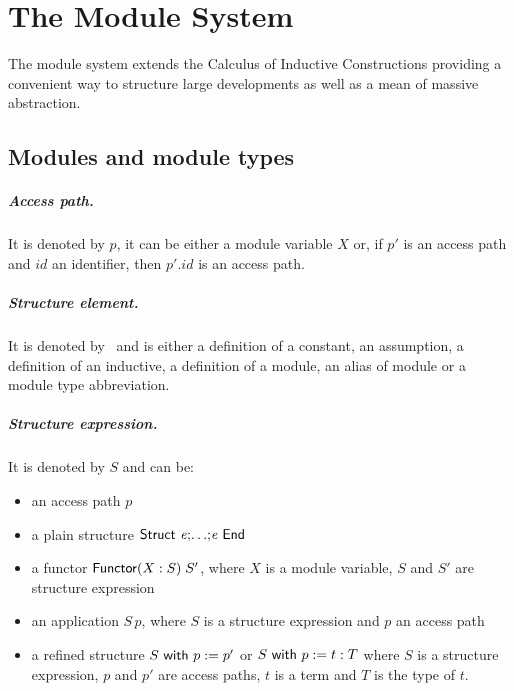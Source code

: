 \chapter[The Module System]{The Module System\label{chapter:Modules}}

The module system extends the Calculus of Inductive Constructions
providing a convenient way to structure large developments as well as
a mean of massive abstraction.

\section{Modules and module types}

\paragraph{Access path.} It is denoted by $p$, it can be either a module 
variable $X$ or, if $p'$ is an access path and $id$ an identifier, then
$p'.id$ is an access path.

\paragraph{Structure element.} It is denoted by \elem\ and is either a
definition of a constant, an assumption, a definition of an inductive,
 a definition of a module, an alias of module or a module type abbreviation.

\paragraph{Structure expression.} It is denoted by $S$ and can be:
\begin{itemize}
\item an access path $p$
\item a plain structure ${\sf Struct}~{{\it e}} {\tt ;} {\ldots} {\tt ;} {{\it e}}~{\sf End}$
\item a functor ${\sf Functor}(X:S)\;S'$, where $X$ is a module variable,
  $S$ and $S'$ are structure expression
\item an application $S\,p$, where $S$ is a structure expression and $p$ 
an access path 
\item a refined structure $S~{\sf with}~p := p'$ or $S~{\sf with}~p := t:T$ where $S$
is a structure expression, $p$ and $p'$ are access paths, $t$ is a term 
and $T$ is the type of $t$.
\end{itemize}


